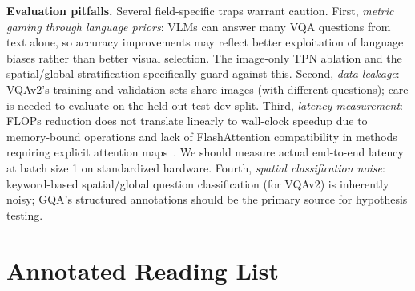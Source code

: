 \documentclass[11pt,twocolumn]{article}
\begin{document}
\textbf{Evaluation pitfalls.} Several field-specific traps warrant caution. First, \emph{metric gaming through language priors}: VLMs can answer many VQA questions from text alone, so accuracy improvements may reflect better exploitation of language biases rather than better visual selection. The image-only TPN ablation and the spatial/global stratification specifically guard against this. Second, \emph{data leakage}: VQAv2's training and validation sets share images (with different questions); care is needed to evaluate on the held-out test-dev split. Third, \emph{latency measurement}: FLOPs reduction does not translate linearly to wall-clock speedup due to memory-bound operations and lack of FlashAttention compatibility in methods requiring explicit attention maps~\cite{chen2024fastv}. We should measure actual end-to-end latency at batch size 1 on standardized hardware. Fourth, \emph{spatial classification noise}: keyword-based spatial/global question classification (for VQAv2) is inherently noisy; GQA's structured annotations should be the primary source for hypothesis testing.

\section{Annotated Reading List}
\label{sec:readings}
\end{document}
